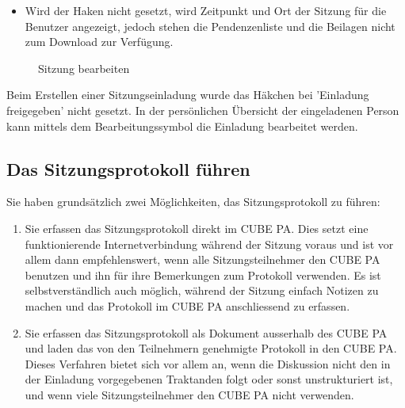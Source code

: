 \begin{itemize}
\item
Wird der Haken nicht gesetzt, wird Zeitpunkt und Ort der Sitzung für die Benutzer angezeigt, jedoch stehen die Pendenzenliste und die Beilagen nicht zum Download zur Verfügung.
\end{itemize}

\begin{figure}[H]
\caption{Sitzung bearbeiten}
\end{figure}

\begin{small}
Beim Erstellen einer Sitzungseinladung wurde das Häkchen bei 'Einladung freigegeben' nicht gesetzt. In der persönlichen Übersicht der eingeladenen Person kann mittels dem Bearbeitungssymbol die Einladung bearbeitet werden.
\end{small}


\subsection{Das Sitzungsprotokoll führen}

Sie haben grundsätzlich zwei Möglichkeiten, das Sitzungsprotokoll zu führen:

\begin{enumerate}
\item
Sie erfassen das Sitzungsprotokoll direkt im CUBE PA. Dies setzt eine funktionierende Internetverbindung während der Sitzung voraus und ist vor allem dann empfehlenswert, wenn alle Sitzungsteilnehmer den CUBE PA benutzen und ihn für ihre Bemerkungen zum Protokoll verwenden. Es ist selbstverständlich auch möglich, während der Sitzung einfach Notizen
zu machen und das Protokoll im CUBE PA anschliessend zu erfassen.
\item
Sie erfassen das Sitzungsprotokoll als Dokument ausserhalb des CUBE PA und laden das von den Teilnehmern genehmigte Protokoll in den CUBE PA. Dieses Verfahren bietet sich vor allem an, wenn die Diskussion nicht den in der Einladung vorgegebenen Traktanden folgt oder sonst unstrukturiert ist, und wenn viele Sitzungsteilnehmer den CUBE PA nicht
verwenden.
\end{enumerate}


